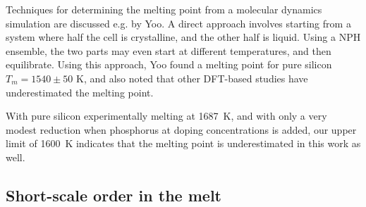 \documentclass[11pt,bibliography=totoc,index=totoc]{scrbook}   %
\begin{document}
Techniques for determining the melting point from a molecular dynamics simulation are discussed e.g. by Yoo.\cite{Yoo:2009} 
A direct approach involves starting from a system where half the cell is crystalline, and the other half is liquid. 
Using a NPH ensemble, the two parts may even start at different temperatures, and then equilibrate. 
Using this approach, Yoo found a melting point for pure silicon $T_m = 1540 \pm 50$ K, and also noted that other DFT-based studies have 
underestimated the melting point.\cite{Yoo:2009}

With pure silicon experimentally melting at \SI{1687}{\kelvin}, and with only a very modest reduction when phosphorus at doping concentrations is added,\cite{Safarian:2011} our upper limit of \SI{1600}{\kelvin} indicates that the melting point is underestimated in this work as well.

%
\subsection{Short-scale order in the melt}\label{sec:pair-distribution}
%
\end{document}
